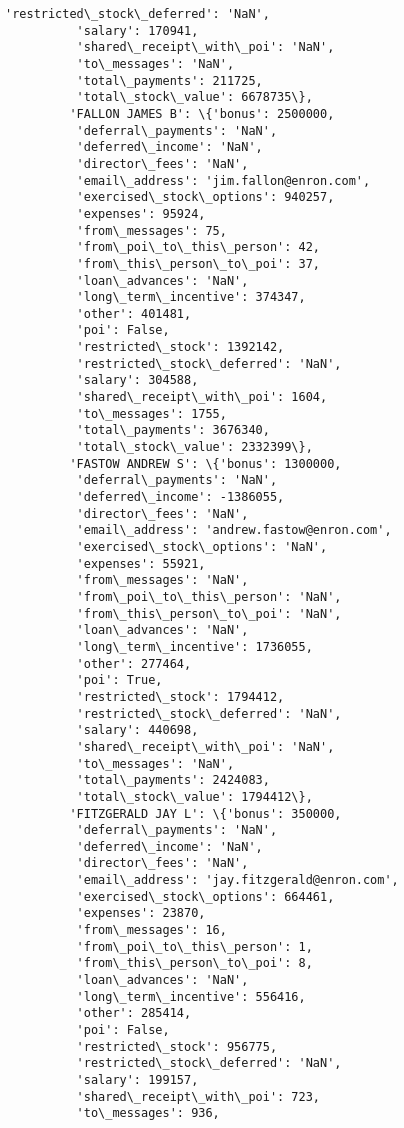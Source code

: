 \documentclass[11pt]{article}
\begin{document}
\begin{Verbatim}[commandchars=\\\{\}]
          'restricted\_stock\_deferred': 'NaN',
          'salary': 170941,
          'shared\_receipt\_with\_poi': 'NaN',
          'to\_messages': 'NaN',
          'total\_payments': 211725,
          'total\_stock\_value': 6678735\},
         'FALLON JAMES B': \{'bonus': 2500000,
          'deferral\_payments': 'NaN',
          'deferred\_income': 'NaN',
          'director\_fees': 'NaN',
          'email\_address': 'jim.fallon@enron.com',
          'exercised\_stock\_options': 940257,
          'expenses': 95924,
          'from\_messages': 75,
          'from\_poi\_to\_this\_person': 42,
          'from\_this\_person\_to\_poi': 37,
          'loan\_advances': 'NaN',
          'long\_term\_incentive': 374347,
          'other': 401481,
          'poi': False,
          'restricted\_stock': 1392142,
          'restricted\_stock\_deferred': 'NaN',
          'salary': 304588,
          'shared\_receipt\_with\_poi': 1604,
          'to\_messages': 1755,
          'total\_payments': 3676340,
          'total\_stock\_value': 2332399\},
         'FASTOW ANDREW S': \{'bonus': 1300000,
          'deferral\_payments': 'NaN',
          'deferred\_income': -1386055,
          'director\_fees': 'NaN',
          'email\_address': 'andrew.fastow@enron.com',
          'exercised\_stock\_options': 'NaN',
          'expenses': 55921,
          'from\_messages': 'NaN',
          'from\_poi\_to\_this\_person': 'NaN',
          'from\_this\_person\_to\_poi': 'NaN',
          'loan\_advances': 'NaN',
          'long\_term\_incentive': 1736055,
          'other': 277464,
          'poi': True,
          'restricted\_stock': 1794412,
          'restricted\_stock\_deferred': 'NaN',
          'salary': 440698,
          'shared\_receipt\_with\_poi': 'NaN',
          'to\_messages': 'NaN',
          'total\_payments': 2424083,
          'total\_stock\_value': 1794412\},
         'FITZGERALD JAY L': \{'bonus': 350000,
          'deferral\_payments': 'NaN',
          'deferred\_income': 'NaN',
          'director\_fees': 'NaN',
          'email\_address': 'jay.fitzgerald@enron.com',
          'exercised\_stock\_options': 664461,
          'expenses': 23870,
          'from\_messages': 16,
          'from\_poi\_to\_this\_person': 1,
          'from\_this\_person\_to\_poi': 8,
          'loan\_advances': 'NaN',
          'long\_term\_incentive': 556416,
          'other': 285414,
          'poi': False,
          'restricted\_stock': 956775,
          'restricted\_stock\_deferred': 'NaN',
          'salary': 199157,
          'shared\_receipt\_with\_poi': 723,
          'to\_messages': 936,

\end{Verbatim}
\end{document}
